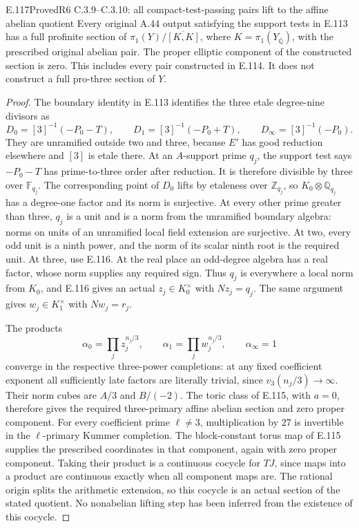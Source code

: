 \begin{result}{E.117}{Proved}{R6 C.3.9--C.3.10: all compact-test-passing pairs lift to the affine abelian quotient}
Every original A.44 output satisfying the support tests in E.113
has a full profinite section of
$\pi_1(Y)/\overline{[K,K]}$, where
$K=\pi_1(Y_{\overline{\mathbb Q}})$, with the prescribed original
abelian pair. The proper elliptic component of the constructed
section is zero. This includes every pair constructed in E.114.
It does not construct a full pro-three section of $Y$.
\end{result}
\begin{proof}
The boundary identity in E.113 identifies the three etale degree-nine
divisors as
\[
 D_0=[3]^{-1}(-P_0-T),\qquad
 D_1=[3]^{-1}(-P_0+T),\qquad
 D_\infty=[3]^{-1}(-P_0).
\]
They are unramified outside two and three, because $E'$ has good
reduction elsewhere and $[3]$ is etale there. At an $A$-support
prime $q_j$, the support test says $-P_0-T$ has prime-to-three order
after reduction. It is therefore divisible by three over
$\mathbb F_{q_j}$. The corresponding point of $D_0$ lifts by
etaleness over $\mathbb Z_{q_j}$, so $K_0\otimes\mathbb Q_{q_j}$
has a degree-one factor and its norm is surjective. At every other
prime greater than three, $q_j$ is a unit and is a norm from the
unramified boundary algebra: norms on units of an unramified local
field extension are surjective. At two, every odd unit is a ninth
power, and the norm of its scalar ninth root is the required unit.
At three, use E.116. At the real place an odd-degree algebra has
a real factor, whose norm supplies any required sign.
Thus $q_j$ is everywhere a local norm from $K_0$, and E.116 gives
an actual $z_j\in K_0^\times$ with $N z_j=q_j$.
The same argument gives $w_j\in K_1^\times$ with $Nw_j=r_j$.

The products
\[
 \alpha_0=\prod_j z_j^{n_j/3},\qquad
 \alpha_1=\prod_j w_j^{n_j/3},\qquad\alpha_\infty=1
\]
converge in the respective three-power completions: at any fixed
coefficient exponent all sufficiently late factors are literally
trivial, since $v_3(n_j/3)\to\infty$. Their norm cubes are $A/3$
and $B/(-2)$. The toric class of E.115, with $a=0$, therefore gives
the required three-primary affine abelian section and zero proper
component. For every coefficient prime $\ell\ne3$, multiplication
by $27$ is invertible in the $\ell$-primary Kummer completion.
The block-constant torus map of E.115 supplies the prescribed
coordinates in that component, again with zero proper component.
Taking their product is a continuous cocycle for $TJ$, since maps
into a product are continuous exactly when all component maps are.
The rational origin splits the arithmetic extension, so this cocycle
is an actual section of the stated quotient. No nonabelian lifting
step has been inferred from the existence of this cocycle.
\end{proof}


